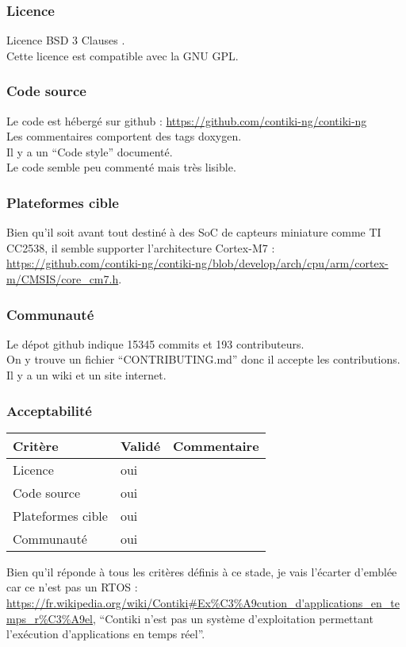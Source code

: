 \subsubsection{Licence}
Licence BSD 3 Clauses \cite{ref8}.\\

Cette licence est compatible avec la GNU GPL.

\subsubsection{Code source}
Le code est hébergé sur github : \url{https://github.com/contiki-ng/contiki-ng}\\

Les commentaires comportent des tags doxygen.\\

Il y a un \enquote{Code style} documenté.\\

Le code semble peu commenté mais très lisible.

\subsubsection{Plateformes cible}
Bien qu'il soit avant tout destiné à des SoC de capteurs miniature comme TI CC2538,
il semble supporter l'architecture Cortex-M7 :
\url{https://github.com/contiki-ng/contiki-ng/blob/develop/arch/cpu/arm/cortex-m/CMSIS/core_cm7.h}.

\subsubsection{Communauté}
Le dépot github indique 15345 commits et 193 contributeurs.\\

On y trouve un fichier \enquote{CONTRIBUTING.md} donc il accepte les contributions.\\

Il y a un wiki et un site internet.

\subsubsection{Acceptabilité}
\begin{tabular}{lll}
\toprule
	Critère				&	Validé		&	Commentaire	\\
\midrule
	Licence				&	oui			&		\\
	Code source			&	oui			&		\\
	Plateformes cible	&	oui			&		\\
	Communauté			&	oui			&		\\
\bottomrule
\end{tabular}

Bien qu'il réponde à tous les critères définis à ce stade, je vais l'écarter d'emblée
car ce n'est pas un RTOS : 
\url{https://fr.wikipedia.org/wiki/Contiki#Ex%C3%A9cution_d'applications_en_temps_r%C3%A9el},
\enquote{Contiki n'est pas un système d'exploitation permettant l'exécution
d'applications en temps réel}.

